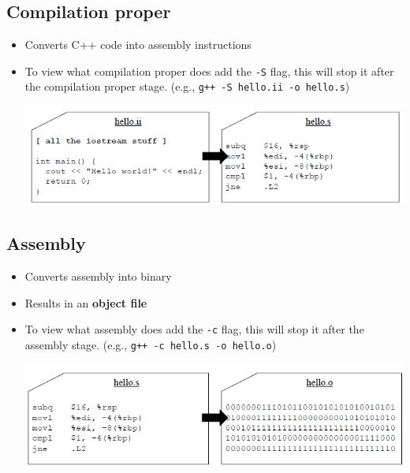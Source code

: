 \subsection{Compilation proper}
\begin{itemize}
	\item Converts C++ code into assembly instructions
	\item To view what compilation proper does add the \lstinline[style=bash]{-S} flag, this will stop it after the compilation proper stage. (e.g., \lstinline[style=bash]{g++ -S hello.ii -o hello.s})
	\begin{center}
		\includegraphics[scale=0.6]{sections/lec1/comp.png}
	\end{center}
\end{itemize}

\subsection{Assembly}
\begin{itemize}
	\item Converts assembly into binary
	\item Results in an \textbf{object file}
	\item To view what assembly does add the \lstinline[style=bash]{-c} flag, this will stop it after the assembly stage. (e.g., \lstinline[style=bash]{g++ -c hello.s -o hello.o})
	\begin{center}
		\includegraphics[scale=0.6]{sections/lec1/ass.png}
	\end{center}
\end{itemize}

